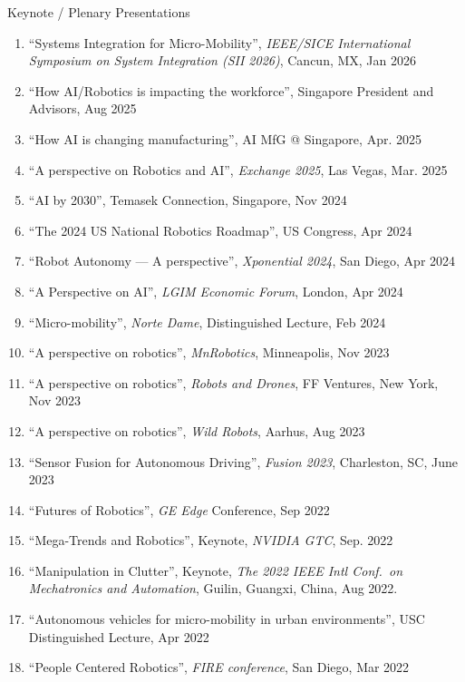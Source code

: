 \documentclass{article}
\begin{document}
\begin{cv}
	\begin{cvlist}{Keynote / Plenary Presentations}
		\item
		\begin{enumerate}
			\item ``Systems Integration for Micro-Mobility'', {\em IEEE/SICE International Symposium on System Integration (SII 2026)},
				Cancun, MX, Jan 2026
		    \item ``How AI/Robotics is impacting the workforce'', Singapore President and Advisors, Aug 2025
			\item ``How AI is changing manufacturing'', AI MfG @ Singapore, Apr. 2025
			\item ``A perspective on Robotics and AI'', {\em Exchange 2025}, Las Vegas, Mar. 2025
			\item ``AI by 2030'', Temasek Connection, Singapore, Nov 2024
			\item ``The 2024 US National Robotics Roadmap'', US Congress, Apr 2024
			\item ``Robot Autonomy --- A perspective'', {\em Xponential 2024}, San Diego, Apr 2024
			\item ``A Perspective on AI'', {\em LGIM Economic Forum}, London, Apr 2024
			\item ``Micro-mobility'', {\em Norte Dame}, Distinguished Lecture, Feb 2024
			\item ``A perspective on robotics'', {\em MnRobotics}, Minneapolis, Nov 2023
			\item ``A perspective on robotics'', {\em Robots and Drones}, FF Ventures, New
			      York, Nov 2023
			\item ``A perspective on robotics'', {\em Wild Robots}, Aarhus, Aug 2023
			\item ``Sensor Fusion for Autonomous Driving'', {\em Fusion 2023}, Charleston,
			      SC, June 2023
			\item ``Futures of Robotics'', {\em GE Edge\/} Conference, Sep 2022
			\item ``Mega-Trends and Robotics'', Keynote, {\em NVIDIA GTC}, Sep. 2022
			\item ``Manipulation in Clutter'', Keynote, {\em The 2022 IEEE Intl Conf.\ on
					      Mechatronics and Automation}, Guilin, Guangxi, China, Aug 2022.
			\item ``Autonomous vehicles for micro-mobility in urban environments'', USC
			      Distinguished Lecture, Apr 2022
			\item ``People Centered Robotics'', {\em FIRE conference}, San Diego, Mar
			      2022

\end{enumerate}
\end{cvlist}
\end{cv}
\end{document}
